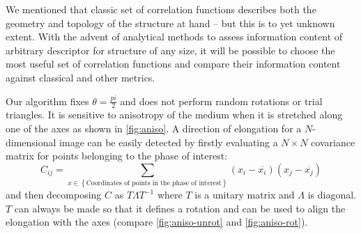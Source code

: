 \documentclass[reprint,amsmath,amssymb,aps,pre,showkeys,showpacs]{revtex4-1}
\begin{document}
We mentioned that classic set of correlation functions describes
both the geometry and topology of the structure at hand -- but this is to yet
unknown extent. With the advent of analytical methods
\cite{cherkasov2023towards} to assess information content of arbitrary
descriptor for structure of any size, it will be possible to choose the most
useful set of correlation functions and compare their information content
against classical and other metrics.

Our algorithm fixes $\theta = \frac{pi}{2}$ and does not perform random
rotations or trial triangles. It is sensitive to anisotropy of the medium
when it is stretched along one of the axes as shown in \cref{fig:aniso}. A
direction of elongation for a $N$-dimensional image can be easily detected by
firstly evaluating a $N \times N$ covariance matrix for points belonging to the
phase of interest:
\begin{equation}
  C_{ij} = \sum_{x \in \left\{ \text{Coordinates of points in the
      phase of interest} \right\}} (x_i - \overline{x_i})(x_j - \overline{x_j})
\end{equation}
and then decomposing $C$ as $T \Lambda T^{-1}$ where $T$ is a unitary matrix and
$\Lambda$ is diagonal. $T$ can always be made so that it defines a rotation and
can be used to align the elongation with the axes (compare \cref{fig:aniso-unrot}
and \cref{fig:aniso-rot}).
\end{document}
